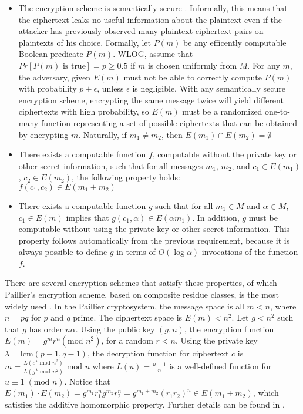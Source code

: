 \begin{itemize}
\item The encryption scheme is semantically secure \cite{Goldwasser:Micali}.
Informally, this means that the ciphertext leaks no useful information
about the plaintext even if the attacker has previously observed many
plaintext-ciphertext pairs on plaintexts of his choice. Formally,
let $P(m)$ be any efficently computable Boolean predicate $P(m)$.
WLOG, assume that $Pr[P(m)\mbox{ is true}]=p\ge0.5$ if $m$ is chosen
uniformly from $M$. For any $m$, the adversary, given $E(m)$ must
not be able to correctly compute $P(m)$ with probability $p+\epsilon$,
unless $\epsilon$ is negligible. With any semantically secure encryption
scheme, encrypting the same message twice will yield different ciphertexts
with high probability, so $E(m)$ must be a randomized one-to-many
function representing a set of possible ciphertexts that can be obtained
by encrypting $m$. Naturally, if $m_{1}\neq m_{2}$, then $E(m_{1})\cap E(m_{2})=\emptyset$
\item There exists a computable function $f$, computable without the private
key or other secret information, such that for all messages $m_{1}$,
$m_{2}$, and $c_{1}\in E(m_{1})$, $c_{2}\in E(m_{2})$, the following
property holds:\\
$f\left(c_{1},c_{2}\right)\in E(m_{1}+m_{2})$
\item There exists a computable function $g$ such that for all $m_{1}\in M$
and $\alpha\in M$, $c_{1}\in E(m)$ implies that $g(c_{1},\alpha)\in E(\alpha m_{1})$.
In addition, $g$ must be computable without using the private key
or other secret information. This property follows automatically from
the previous requirement, because it is always possible to define
$g$ in terms of $O(\log\alpha)$ invocations of the function $f$.
\end{itemize}
There are several encryption schemes that satisfy these properties,
of which Paillier's encryption scheme, based on composite residue
classes, is the most widely used \cite{Paillier99}. In the Paillier
cryptosystem, the message space is all $m<n$, where $n=pq$ for $p$
and $q$ prime. The ciphertext space is $E(m)<n^{2}$. Let $g<n^{2}$
such that $g$ has order $n\alpha$. Using the public key $(g,n)$,
the encryption function $E(m)=g^{m}r^{n}\left(\mbox{mod }n^{2}\right)$,
for a random $r<n$. Using the private key $\lambda=\mbox{lcm}(p-1,q-1)$,
the decryption function for ciphertext $c$ is $m=\frac{L\left(c^{\lambda}\mbox{ mod }n^{2}\right)}{L\left(g^{\lambda}\mbox{ mod }n^{2}\right)}\mbox{ mod }n$
where $L(u)=\frac{u-1}{n}$ is a well-defined function for $u\equiv1\;(\mbox{mod }n)$.
Notice that $E(m_{1})\cdot E(m_{2})=g^{m_{1}}r_{1}^{n}g^{m_{2}}r_{2}^{n}=g^{m_{1}+m_{2}}(r_{1}r_{2})^{n}\in E(m_{1}+m_{2})$,
which satisfies the additive homomorphic property. Further details
can be found in \cite{Paillier99}.


